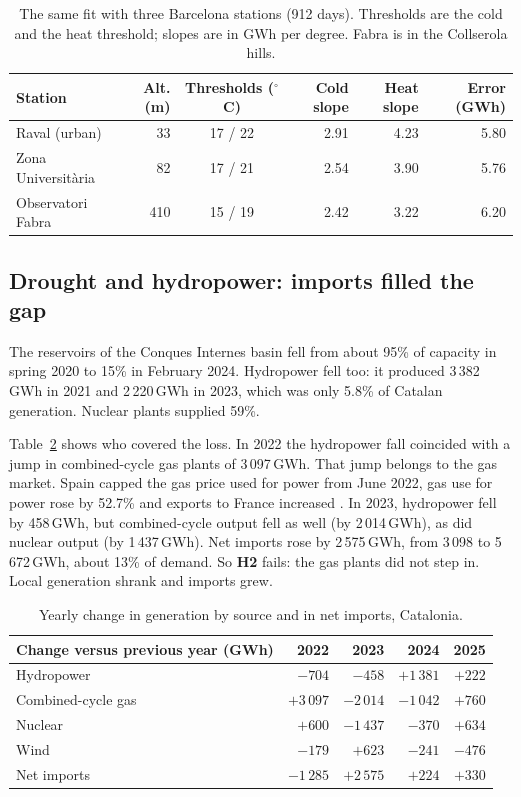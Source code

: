 \documentclass[11pt,a4paper]{article}
\begin{document}
\begin{table}[t]
\centering
\small
\setlength{\tabcolsep}{5pt}
\begin{tabular}{@{}lrcrrr@{}}
\toprule
Station & Alt. (m) & Thresholds ($^\circ$C) & Cold slope & Heat slope & Error (GWh)\\
\midrule
Raval (urban) & 33 & 17 / 22 & 2.91 & 4.23 & 5.80\\
Zona Universit\`aria & 82 & 17 / 21 & 2.54 & 3.90 & 5.76\\
Observatori Fabra & 410 & 15 / 19 & 2.42 & 3.22 & 6.20\\
\bottomrule
\end{tabular}
\caption{The same fit with three Barcelona stations (912 days). Thresholds are the cold and the heat threshold; slopes are in GWh per degree. Fabra is in the Collserola hills.}
\label{tab:stations}
\end{table}

\subsection{Drought and hydropower: imports filled the gap}

The reservoirs of the Conques Internes basin fell from about 95\% of capacity in spring 2020 to 15\% in February 2024. Hydropower fell too: it produced 3\,382\,GWh in 2021 and 2\,220\,GWh in 2023, which was only 5.8\% of Catalan generation. Nuclear plants supplied 59\%.

Table~\ref{tab:changes} shows who covered the loss. In 2022 the hydropower fall coincided with a jump in combined-cycle gas plants of 3\,097\,GWh. That jump belongs to the gas market. Spain capped the gas price used for power from June 2022, gas use for power rose by 52.7\% and exports to France increased \citep{cgep}. In 2023, hydropower fell by 458\,GWh, but combined-cycle output fell as well (by 2\,014\,GWh), as did nuclear output (by 1\,437\,GWh). Net imports rose by 2\,575\,GWh, from 3\,098 to 5\,672\,GWh, about 13\% of demand. So \textbf{H2} fails: the gas plants did not step in. Local generation shrank and imports grew.

\begin{table}[t]
\centering
\small
\begin{tabular}{@{}lrrrr@{}}
\toprule
Change versus previous year (GWh) & 2022 & 2023 & 2024 & 2025\\
\midrule
Hydropower & $-704$ & $-458$ & $+1\,381$ & $+222$\\
Combined-cycle gas & $+3\,097$ & $-2\,014$ & $-1\,042$ & $+760$\\
Nuclear & $+600$ & $-1\,437$ & $-370$ & $+634$\\
Wind & $-179$ & $+623$ & $-241$ & $-476$\\
Net imports & $-1\,285$ & $+2\,575$ & $+224$ & $+330$\\
\bottomrule
\end{tabular}
\caption{Yearly change in generation by source and in net imports, Catalonia.}
\label{tab:changes}
\end{table}
\end{document}

